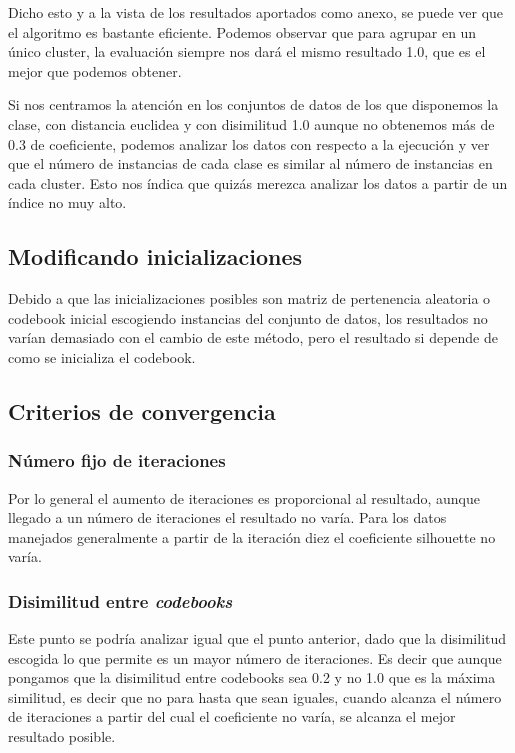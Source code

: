\documentclass[10pt,a4paper]{article}
\begin{document}
Dicho esto y a la vista de los resultados aportados como anexo, se puede ver que el algoritmo es bastante eficiente. Podemos observar que para agrupar en un único cluster, la evaluación siempre nos dará el mismo resultado 1.0, que es el mejor que podemos obtener.

Si nos centramos la atención en los conjuntos de datos de los que disponemos la clase, con distancia euclidea y con disimilitud 1.0 aunque no obtenemos más de 0.3 de coeficiente, podemos analizar los datos con respecto a la ejecución y ver que el número de instancias de cada clase es similar al número de instancias en cada cluster. Esto nos índica que quizás merezca analizar los datos a partir de un índice no muy alto.

\subsection{Modificando inicializaciones}

Debido a que las inicializaciones posibles son matriz de pertenencia aleatoria o codebook inicial escogiendo instancias del conjunto de datos, los resultados no varían demasiado con el cambio de este método, pero el resultado si depende de como se inicializa el codebook.

\subsection{Criterios de convergencia}

\subsubsection{Número fijo de iteraciones}

Por lo general el aumento de iteraciones es proporcional al resultado, aunque llegado a un número de iteraciones el resultado no varía. Para los datos manejados generalmente a partir de la iteración diez el coeficiente silhouette no varía.

\subsubsection{Disimilitud entre \textit{codebooks}}

Este punto se podría analizar igual que el punto anterior, dado que la disimilitud escogida lo que permite es un mayor número de iteraciones. Es decir que aunque pongamos que la disimilitud entre codebooks sea 0.2 y no 1.0 que es la máxima similitud, es decir que no para hasta que sean iguales, cuando alcanza el número de iteraciones a partir del cual el coeficiente no varía, se alcanza el mejor resultado posible.
\end{document}
